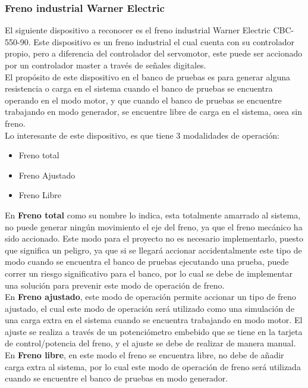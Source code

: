 \documentclass[12pt,titlepage]{article}
\begin{document}
\subsubsection{Freno industrial Warner Electric } 
El siguiente dispositivo a reconocer es el freno industrial Warner Electric CBC-550-90. Este dispositivo es un freno industrial el cual cuenta con su controlador propio, pero a diferencia del controlador del servomotor, este  puede ser accionado por un controlador master a través de señales digitales. \\ 

El propósito de este dispositivo en el banco de pruebas es para generar alguna resistencia o carga en el sistema cuando el banco de pruebas se encuentra operando en el modo motor, y que cuando el banco de pruebas se encuentre trabajando en modo generador, se encuentre libre de carga en el sistema, osea sin freno. \\ 
\newpage
Lo interesante de este dispositivo, es que tiene 3 modalidades de operación: 
\begin{itemize}
\item Freno total
\item Freno Ajustado
\item Freno Libre
\end{itemize}
 
 En \textbf{Freno total} como su nombre lo indica, esta totalmente amarrado al sistema, no puede generar ningún movimiento el eje del freno, ya que el freno mecánico ha sido accionado. Este modo para el proyecto no es necesario implementarlo, puesto que significa un peligro, ya que si se llegará  accionar accidentalmente este tipo de modo  cuando se encuentra el banco de pruebas ejecutando una prueba,  puede correr un riesgo significativo para el banco, por lo cual se debe de implementar una solución para prevenir este modo de operación de freno. \\ 
 
 En \textbf{Freno ajustado}, este modo de operación permite accionar un tipo de freno ajustado, el cual este modo de operación será utilizado como una simulación de una carga extra en el sistema cuando se encuentra trabajando en modo motor. El ajuste se realiza a través de un potenciómetro embebido que se tiene en la tarjeta de control/potencia del freno, y el ajuste se debe de realizar de manera manual. \\ 
 
En \textbf{Freno libre}, en este modo el freno se encuentra libre, no debe de añadir carga extra al sistema, por lo cual este modo de operación de freno será utilizada cuando se encuentre el banco de pruebas en modo generador. \\ 
  
\end{document}
